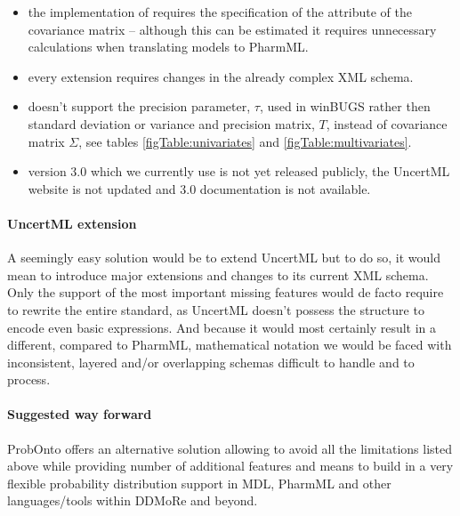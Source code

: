 \begin{itemize}
\item
the implementation of  requires the specification 
of the  attribute of the covariance matrix -- although this can be estimated
it requires unnecessary calculations when translating models to PharmML. 
\item
every extension requires changes in the already complex XML schema.
\item
doesn't support the precision parameter, $\tau$, used in winBUGS  
rather then standard deviation or variance and precision matrix, $T$, instead 
of covariance matrix $\Sigma$, see tables \ref{figTable:univariates} and \ref{figTable:multivariates}.
\item
version 3.0 which we currently use is not yet released publicly, the UncertML website 
is not updated and 3.0 documentation is not available.
\end{itemize}

\paragraph{UncertML extension} A seemingly easy solution would be to extend UncertML 
but to do so, it would mean to introduce major extensions and changes to its 
current XML schema. Only the support of the most important missing features would 
de facto require to rewrite the entire standard, as UncertML doesn't possess the 
structure to encode even basic expressions. And because it would most 
certainly result in a different, compared to PharmML, mathematical notation we would 
be faced with inconsistent, layered and/or overlapping schemas difficult to handle and 
to process.

\paragraph{Suggested way forward} ProbOnto offers an alternative solution allowing
to avoid all the limitations listed above while providing number of additional features
and means to build in a very flexible probability distribution support in MDL, PharmML 
and other languages/tools within DDMoRe and beyond. 

